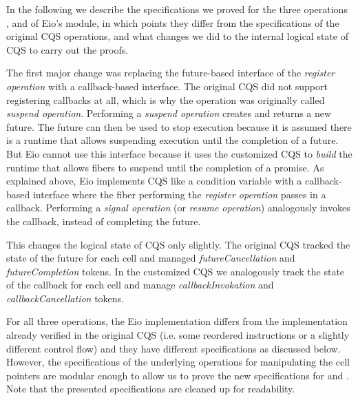In the following we describe the specifications we proved for the three operations ,  and  of Eio's  module, in which points they differ from the specifications of the original CQS operations, and what changes we did to the internal logical state of CQS to carry out the proofs.


The first major change was replacing the future-based interface of the \emph{register operation} with a callback-based interface.
The original CQS did not support registering callbacks at all, which is why the operation was originally called \emph{suspend operation}.
Performing a \emph{suspend operation} creates and returns a new future.
The future can then be used to stop execution because it is assumed there is a runtime that allows suspending execution until the completion of a future.
But Eio cannot use this interface because it uses the customized CQS to \emph{build} the runtime that allows fibers to suspend until the completion of a promise.
As explained above, Eio implements CQS like a condition variable with a callback-based interface where the fiber performing the \emph{register operation} passes in a callback.
Performing a \emph{signal operation} (or \emph{resume operation}) analogously invokes the callback, instead of completing the future.

This changes the logical state of CQS only slightly.
The original CQS tracked the state of the future for each cell and managed \emph{futureCancellation} and \emph{futureCompletion} tokens.
In the customized CQS we analogously track the state of the callback for each cell and manage \emph{callbackInvokation} and \emph{callbackCancellation} tokens.

For all three operations, the Eio implementation differs from the implementation already verified in the original CQS (i.e. some reordered instructions or a slightly different control flow) and they have different specifications as discussed below.
However, the specifications of the underlying operations for manipulating the cell pointers are modular enough to allow us to prove the new specifications for  and .
Note that the presented specifications are cleaned up for readability.


